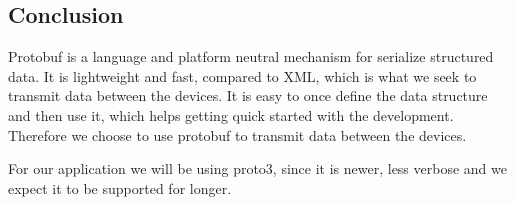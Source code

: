 \subsection{Conclusion}
Protobuf is a language and platform neutral mechanism for serialize structured data.
It is lightweight and fast, compared to XML, which is what we seek to transmit data between the devices.
It is easy to once define the data structure and then use it, which helps getting quick started with the development.
Therefore we choose to use protobuf to transmit data between the devices.

For our application we will be using proto3, since it is newer, less verbose and we expect it to be supported for longer.
